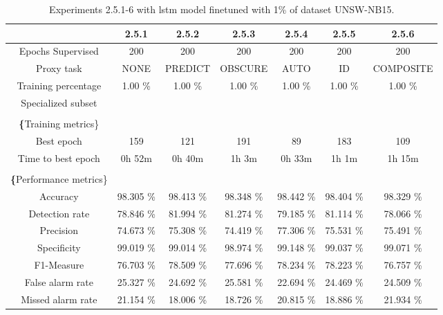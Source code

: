 \begin{table}[htb]
    \centering
    \begin{tabular}{@{}ccccccc@{}}
        \toprule
         & 2.5.1 & 2.5.2 & 2.5.3 & 2.5.4 & 2.5.5 & 2.5.6 \\
        \midrule
        Epochs Supervised &  200 &  200 &  200 &  200 &  200 &  200 \\
        Proxy task &  NONE &  PREDICT &  OBSCURE &  AUTO &  ID &  COMPOSITE \\
        Training percentage &  1.00 \% &  1.00 \% &  1.00 \% &  1.00 \% &  1.00 \% &  1.00 \% \\
        Specialized subset &   &   &   &   &   &   \\
         \\
        \textbf\{Training metrics\} &  &  &  &  &  &  \\
        Best epoch &  159 &  121 &  191 &  89 &  183 &  109 \\
        Time to best epoch &  0h 52m &  0h 40m &  1h 3m &  0h 33m &  1h 1m &  1h 15m \\
         \\
        \textbf\{Performance metrics\} &  &  &  &  &  &  \\
        Accuracy &  98.305 \% &  98.413 \% &  98.348 \% &  98.442 \% &  98.404 \% &  98.329 \% \\
        Detection rate &  78.846 \% &  81.994 \% &  81.274 \% &  79.185 \% &  81.114 \% &  78.066 \% \\
        Precision &  74.673 \% &  75.308 \% &  74.419 \% &  77.306 \% &  75.531 \% &  75.491 \% \\
        Specificity &  99.019 \% &  99.014 \% &  98.974 \% &  99.148 \% &  99.037 \% &  99.071 \% \\
        F1-Measure &  76.703 \% &  78.509 \% &  77.696 \% &  78.234 \% &  78.223 \% &  76.757 \% \\
        False alarm rate &  25.327 \% &  24.692 \% &  25.581 \% &  22.694 \% &  24.469 \% &  24.509 \% \\
        Missed alarm rate &  21.154 \% &  18.006 \% &  18.726 \% &  20.815 \% &  18.886 \% &  21.934 \% \\
        \bottomrule
    \end{tabular}
    \caption{Experiments 2.5.1-6 with \gls{lstm} model finetuned with 1\% of dataset UNSW-NB15.}
    \label{table:results:lstm:stats_flows15_10}
\end{table}